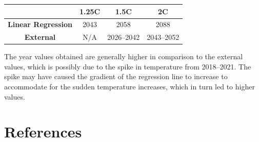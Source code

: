\documentclass[12pt]{mcmthesis}
\begin{document}
    \begin{table}[h]
        \centering
        \begin{tabular}{ |c|c|c|c|}
            \hline
            & \textbf{1.25C} & \textbf{1.5C} & \textbf{2C}         \\
            \hline
            \textbf{Linear Regression} & 2043           & 2058          & 2088                \\
            \hline
            \textbf{External}          & N/A            & 2026--2042    & 2043--2052 \\ \hline
        \end{tabular}
    \end{table}

    The year values obtained are generally higher in comparison to the external values, which is possibly due to the spike in temperature from 2018--2021. The spike may have caused the gradient of the regression line to increase to accommodate for the sudden temperature increases, which in turn led to higher values.



    \section{References}

\end{document}
